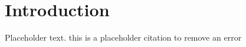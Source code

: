 \section{Introduction}
Placeholder text. this is a placeholder citation to remove an error \cite{breivik2017mpc}

\newpage